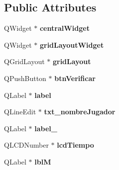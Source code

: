 \subsection*{Public Attributes}
\begin{DoxyCompactItemize}
\item 
\hypertarget{class_ui___main_window_a30075506c2116c3ed4ff25e07ae75f81}{Q\-Widget $\ast$ {\bfseries central\-Widget}}\label{class_ui___main_window_a30075506c2116c3ed4ff25e07ae75f81}

\item 
\hypertarget{class_ui___main_window_a08a857edea57a9e53915f22187c06813}{Q\-Widget $\ast$ {\bfseries grid\-Layout\-Widget}}\label{class_ui___main_window_a08a857edea57a9e53915f22187c06813}

\item 
\hypertarget{class_ui___main_window_a525ed3c5fe0784ac502ee222fba4e205}{Q\-Grid\-Layout $\ast$ {\bfseries grid\-Layout}}\label{class_ui___main_window_a525ed3c5fe0784ac502ee222fba4e205}

\item 
\hypertarget{class_ui___main_window_a8eb0adb09460bff6ea84d805aa580db2}{Q\-Push\-Button $\ast$ {\bfseries btn\-Verificar}}\label{class_ui___main_window_a8eb0adb09460bff6ea84d805aa580db2}

\item 
\hypertarget{class_ui___main_window_ad9c89133780f28e6efa2ec17ceb9cff5}{Q\-Label $\ast$ {\bfseries label}}\label{class_ui___main_window_ad9c89133780f28e6efa2ec17ceb9cff5}

\item 
\hypertarget{class_ui___main_window_a7b9e75600981b2bfc14cc4485ee87371}{Q\-Line\-Edit $\ast$ {\bfseries txt\-\_\-nombre\-Jugador}}\label{class_ui___main_window_a7b9e75600981b2bfc14cc4485ee87371}

\item 
\hypertarget{class_ui___main_window_a2e2516d755e4dd53fc905dabddf2738a}{Q\-Label $\ast$ {\bfseries label\-\_}}\label{class_ui___main_window_a2e2516d755e4dd53fc905dabddf2738a}

\item 
\hypertarget{class_ui___main_window_aeb911b62e28b6082ac2fd1d198e71e3e}{Q\-L\-C\-D\-Number $\ast$ {\bfseries lcd\-Tiempo}}\label{class_ui___main_window_aeb911b62e28b6082ac2fd1d198e71e3e}

\item 
\hypertarget{class_ui___main_window_a01be1e9ef33825ad8d509e2d545c2a01}{Q\-Label $\ast$ {\bfseries lbl\-M}}\label{class_ui___main_window_a01be1e9ef33825ad8d509e2d545c2a01}


\end{DoxyCompactItemize}
